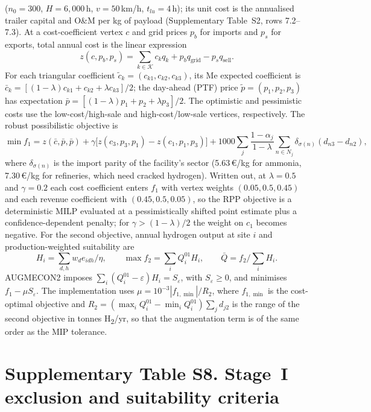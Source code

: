\documentclass[11pt,a4paper]{article}
\begin{document}
($n_0=300$, $H=6{,}000$\,h, $v=50$\,km/h, $t_{lu}=4$\,h); its unit cost is the annualised trailer
capital and O\&M per kg of payload (Supplementary Table~S2, rows 7.2--7.3). At a cost-coefficient vertex $c$ and grid prices $p_b$ for
imports and $p_s$ for exports, total annual cost is the linear expression
\begin{equation}
z(c,p_b,p_s)=\sum_{k\in\mathcal K}c_kq_k+p_bq_{\mathrm{grid}}-p_sq_{\mathrm{sell}}.
\label{eq:s5_cost}
\end{equation}
For each triangular coefficient $\tilde c_k=(c_{k1},c_{k2},c_{k3})$, its Me
expected coefficient is $\bar c_k=[(1-\lambda)c_{k1}+c_{k2}+\lambda c_{k3}]/2$;
the day-ahead (PTF) price $\tilde p=(p_1,p_2,p_3)$ has expectation
$\bar p=[(1-\lambda)p_1+p_2+\lambda p_3]/2$. The optimistic and pessimistic
costs use the low-cost/high-sale and high-cost/low-sale vertices, respectively.
The robust possibilistic objective is
\begin{equation}
\min f_1= z(\bar c,\bar p,\bar p)
+\gamma\big[z(c_3,p_3,p_1)-z(c_1,p_1,p_3)\big]
+1000\sum_j\frac{1-\alpha_j}{1-\lambda}\sum_{n\in N_j}\delta_{\sigma(n)}(d_{n3}-d_{n2}),
\label{eq:s5_rpp_objective}
\end{equation}
where $\delta_{\sigma(n)}$ is the import parity of the facility's sector (5.63\,€/kg for ammonia,
7.30\,€/kg for refineries, which need cracked hydrogen).
Written out, at $\lambda=0.5$ and $\gamma=0.2$ each cost coefficient enters $f_1$ with vertex weights
$(0.05,0.5,0.45)$ and each revenue coefficient with $(0.45,0.5,0.05)$, so the RPP objective is a
deterministic MILP evaluated at a pessimistically shifted point estimate plus a confidence-dependent
penalty; for $\gamma>(1-\lambda)/2$ the weight on $c_1$ becomes negative. For the second objective, annual
hydrogen output at site $i$ and production-weighted suitability are
\begin{equation}
H_i=\sum_{d,h}w_de_{idh}/\eta,\qquad
\max f_2=\sum_iQ_i^{01}H_i,\qquad
\bar Q=f_2/\sum_iH_i.
\label{eq:s5_suitability}
\end{equation}
AUGMECON2 imposes $\sum_i(Q_i^{01}-\varepsilon)H_i=S_\varepsilon$, with
$S_\varepsilon\ge0$, and minimises $f_1-\mu S_\varepsilon$. The implementation
uses $\mu=10^{-3}|f_{1,\min}|/R_2$, where $f_{1,\min}$ is the cost-optimal
objective and $R_2=(\max_iQ_i^{01}-\min_iQ_i^{01})\sum_jd_{j2}$ is the range of the second objective in
tonnes H\textsubscript{2}/yr, so that the augmentation term is of the same order as the MIP tolerance.


\newpage\section{Supplementary Table S8. Stage~I exclusion and suitability criteria}
\end{document}
